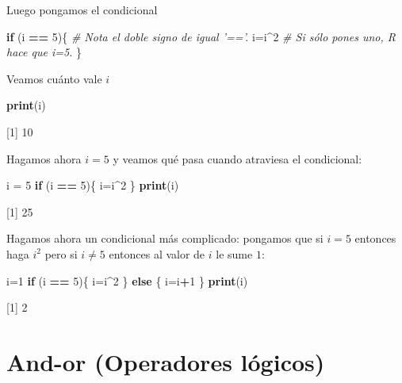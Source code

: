 \documentclass[
]{book}
\newenvironment{Shaded}{\begin{snugshade}}{\end{snugshade}}
\newcommand{\CommentTok}[1]{\textcolor[rgb]{0.56,0.35,0.01}{\textit{#1}}}
\newcommand{\ControlFlowTok}[1]{\textcolor[rgb]{0.13,0.29,0.53}{\textbf{#1}}}
\newcommand{\DecValTok}[1]{\textcolor[rgb]{0.00,0.00,0.81}{#1}}
\newcommand{\KeywordTok}[1]{\textcolor[rgb]{0.13,0.29,0.53}{\textbf{#1}}}
\newcommand{\NormalTok}[1]{#1}
\newcommand{\OperatorTok}[1]{\textcolor[rgb]{0.81,0.36,0.00}{\textbf{#1}}}
\newcommand{\StringTok}[1]{\textcolor[rgb]{0.31,0.60,0.02}{#1}}
\begin{document}
Luego pongamos el condicional

\begin{Shaded}
\begin{Highlighting}[]
\ControlFlowTok{if}\NormalTok{ (i }\OperatorTok{==}\StringTok{ }\DecValTok{5}\NormalTok{)\{   }\CommentTok{# Nota el doble signo de igual '=='. }
\NormalTok{  i=i}\OperatorTok{^}\DecValTok{2}        \CommentTok{# Si sólo pones uno, R hace que i=5.}
\NormalTok{\}}
\end{Highlighting}
\end{Shaded}

Veamos cuánto vale \(i\)

\begin{Shaded}
\begin{Highlighting}[]
\KeywordTok{print}\NormalTok{(i)}
\end{Highlighting}
\end{Shaded}

{[}1{]} 10

Hagamos ahora \(i = 5\) y veamos qué pasa cuando atraviesa el condicional:

\begin{Shaded}
\begin{Highlighting}[]
\NormalTok{i =}\StringTok{ }\DecValTok{5}
\ControlFlowTok{if}\NormalTok{ (i }\OperatorTok{==}\StringTok{ }\DecValTok{5}\NormalTok{)\{   }
\NormalTok{  i=i}\OperatorTok{^}\DecValTok{2}      
\NormalTok{\}}
\KeywordTok{print}\NormalTok{(i)}
\end{Highlighting}
\end{Shaded}

{[}1{]} 25

Hagamos ahora un condicional más complicado: pongamos que si \(i = 5\) entonces haga \(i^2\) pero si \(i \neq 5\) entonces al valor de \(i\) le sume \(1\):

\begin{Shaded}
\begin{Highlighting}[]
\NormalTok{i=}\DecValTok{1}
\ControlFlowTok{if}\NormalTok{ (i }\OperatorTok{==}\StringTok{ }\DecValTok{5}\NormalTok{)\{}
\NormalTok{  i=i}\OperatorTok{^}\DecValTok{2}
\NormalTok{\} }\ControlFlowTok{else}\NormalTok{ \{}
\NormalTok{  i=i}\OperatorTok{+}\DecValTok{1}
\NormalTok{\}}
\KeywordTok{print}\NormalTok{(i)}
\end{Highlighting}
\end{Shaded}

{[}1{]} 2

\hypertarget{and-or-operadores-luxf3gicos}{%
\section{And-or (Operadores lógicos)}\label{and-or-operadores-luxf3gicos}}
\end{document}
